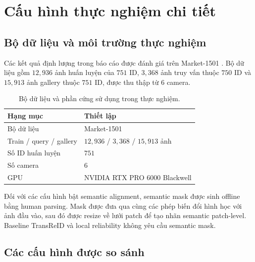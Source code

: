 \section{Cấu hình thực nghiệm chi tiết}
\label{sec:appendix_experimental_config}

\subsection{Bộ dữ liệu và môi trường thực nghiệm}

Các kết quả định lượng trong báo cáo được đánh giá trên Market-1501
\cite{zheng2015market1501}. Bộ dữ liệu gồm $12{,}936$ ảnh huấn luyện của
$751$ ID, $3{,}368$ ảnh truy vấn thuộc $750$ ID và $15{,}913$
ảnh gallery thuộc $751$ ID, được thu thập từ $6$ camera.

\begin{table}[H]
\centering
\renewcommand{\arraystretch}{1.12}
\setlength{\tabcolsep}{4pt}
\begin{tabular}{@{}L{3.0cm}L{5.0cm}@{}}
\toprule
\textbf{Hạng mục} & \textbf{Thiết lập} \\
\midrule
Bộ dữ liệu & Market-1501 \\
Train / query / gallery & $12{,}936$ / $3{,}368$ / $15{,}913$ ảnh \\
Số ID huấn luyện & $751$ \\
Số camera & $6$ \\
GPU & NVIDIA RTX PRO 6000 Blackwell \\
\bottomrule
\end{tabular}
\caption{Bộ dữ liệu và phần cứng sử dụng trong thực nghiệm.}
\label{tab:appendix_dataset_hardware}
\end{table}

Đối với các cấu hình bật semantic alignment, semantic mask được sinh offline
bằng human parsing. Mask được đưa qua cùng các phép biến đổi hình học với ảnh
đầu vào, sau đó được resize về lưới patch để tạo nhãn semantic patch-level.
Baseline TransReID và local reliability không yêu cầu semantic mask.

\subsection{Các cấu hình được so sánh}

